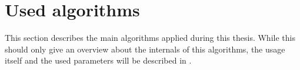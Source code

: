 \section{Used algorithms}

This section describes the main algorithms applied during this thesis. While this should only give an overview about the internals of this algorithms, the usage itself and the used parameters will be described in .






